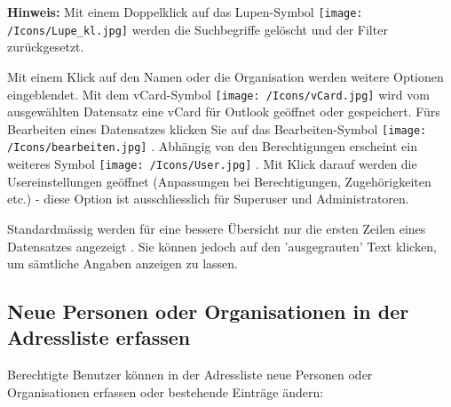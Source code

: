 \vspace{\baselineskip}

\textbf{Hinweis:} Mit einem Doppelklick auf das Lupen-Symbol \texttt{[image: /Icons/Lupe\_kl.jpg]}  werden die Suchbegriffe gelöscht und der Filter zurückgesetzt.

\vspace{\baselineskip}

Mit einem Klick auf den Namen  oder die Organisation werden weitere Optionen eingeblendet. Mit dem vCard-Symbol \texttt{[image: /Icons/vCard.jpg]}  wird vom ausgewählten Datensatz eine vCard für Outlook geöffnet oder gespeichert. Fürs Bearbeiten eines Datensatzes klicken Sie auf das Bearbeiten-Symbol \texttt{[image: /Icons/bearbeiten.jpg]} . Abhängig von den Berechtigungen erscheint ein weiteres Symbol \texttt{[image: /Icons/User.jpg]} . Mit Klick darauf werden die Usereinstellungen geöffnet (Anpassungen bei Berechtigungen, Zugehörigkeiten etc.) - diese Option ist ausschliesslich für Superuser und Administratoren.

\vspace{\baselineskip}

Standardmässig werden für eine bessere Übersicht nur die ersten Zeilen eines Datensatzes angezeigt . Sie können jedoch auf den 'ausgegrauten' Text klicken, um sämtliche Angaben anzeigen zu lassen.

\clearpage
\subsection{Neue Personen oder Organisationen in der Adressliste erfassen}
\label{bkm:Ref2018071901}
Berechtigte Benutzer können in der Adressliste neue Personen oder Organisationen erfassen oder bestehende Einträge ändern:

\vspace{\baselineskip}

